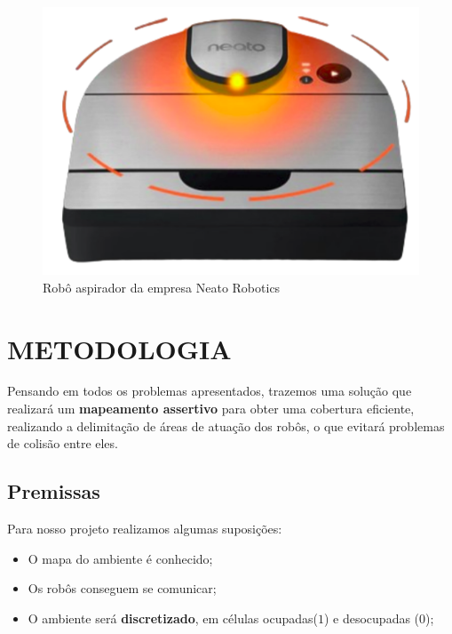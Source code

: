 \documentclass[a4paper, 10pt, conference]{ieeeconf}      %
\begin{document}
\begin{figure}[htb!]
    \centering
    \includegraphics[scale=0.2]{./images/neato_bot.png}
    \caption{Robô aspirador da empresa Neato Robotics}
\end{figure}


\newpage

\section{METODOLOGIA}

Pensando em todos os problemas apresentados, trazemos uma solução que realizará um
\textbf{mapeamento assertivo} para obter uma cobertura eficiente, realizando a delimitação
de áreas de atuação dos robôs, o que evitará problemas de colisão entre eles.

\subsection{Premissas}
Para nosso projeto realizamos algumas suposições:
\begin{itemize}
    \item O mapa do ambiente é conhecido;
    \item Os robôs conseguem se comunicar;
    \item O ambiente será \textbf{discretizado}, em células ocupadas($1$) e desocupadas ($0$);
\end{itemize}
\end{document}
